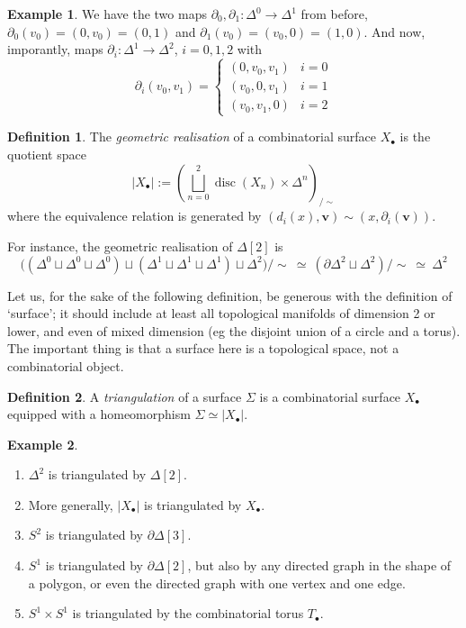 \documentclass{tufte-handout}
\DeclareMathOperator{\disc}{disc}
\theoremstyle{definition}
\newtheorem{definition}{Definition}
\newtheorem{example}{Example}
\begin{document}
\begin{example}
We have the two maps $\partial_0,\partial_1\colon \Delta^0 \to \Delta^1$ from before, $\partial_0(v_0) = (0,v_0) = (0,1)$ 
and $\partial_1(v_0) = (v_0,0) = (1,0)$. And now, imporantly, maps $\partial_i\colon \Delta^1\to \Delta^2$, $i=0,1,2$ with
\[
\partial_i(v_0,v_1) =\begin{cases}
(0,v_0,v_1) & i=0\\
(v_0,0,v_1) & i=1\\
(v_0,v_1,0) & i=2
\end{cases}
\]
\end{example}

\begin{definition}
The \emph{geometric realisation} of a combinatorial surface $X_\bullet$ is the quotient space
\[
|X_\bullet| := \left(\bigsqcup_{n=0}^2 \disc(X_n) \times \Delta^n\right)_{\big/\!\sim}
\]
where the equivalence relation is generated by 
$(d_i(x),\mathbf{v}) \sim (x,\partial_i(\mathbf{v}))$.
\end{definition}

For 
instance, the geometric realisation of $\Delta[2]$ is 
\[
\Big((\Delta^0 \sqcup \Delta^0 \sqcup \Delta^0) \sqcup (\Delta^1 \sqcup 
\Delta^1 \sqcup\Delta^1) \sqcup\Delta^2\Big)/\!\sim\ \simeq\ (\partial\Delta^2 \sqcup\Delta^2)/\!\sim\ \simeq\ \Delta^2
\]

Let us, for the sake of the following definition, be generous with the definition of `surface';
it should include at least all topological manifolds of dimension 2 or lower, and even of mixed
dimension (eg the disjoint union of a circle and a torus). The important thing is that a
surface here is a topological space, not a combinatorial object.

\begin{definition}
A \emph{triangulation} of a surface $\Sigma$ is a combinatorial surface $X_\bullet$ equipped
with 
a homeomorphism $\Sigma \simeq |X_\bullet|$.
\end{definition}

\begin{example}
\begin{enumerate}
\item $\Delta^2$ is triangulated by $\Delta[2]$.
\item More generally, $|X_\bullet|$ is triangulated by $X_\bullet$.
\item $S^2$ is triangulated by $\partial\Delta[3]$.
\item $S^1$ is triangulated by $\partial\Delta[2]$, but also by any directed graph in the shape
of a polygon, or even the directed graph with one vertex and one edge.
\item $S^1\times S^1$ is triangulated by the combinatorial torus $T_\bullet$.
\end{enumerate}
\end{example}
\end{document}
